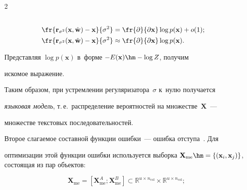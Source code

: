 \begin{multicols}{2}
\begin{align*}
\\


\fr{{\mathbf{r}}_{\sigma^2}(\mathbf{x}, \hat{\mathbf{w}}) - 


\mathbf{x}}{\sigma^2} &= \fr{\partial}{\partial \mathbf{x}}\log p(\mathbf{x}) + o(1);


\\


\fr{{\mathbf{r}}_{\sigma^2}(\mathbf{x}, \hat{\mathbf{w}}) - 


\mathbf{x}}{\sigma^2} &\approx \fr{\partial}{\partial \mathbf{x}}\log 


p(\mathbf{x}).


\end{align*}


Представляя $\log p(\mathbf{x})$ в~форме $-E(\mathbf{x}) \hm- \log Z$, получим 


искомое выражение.





\smallskip





Таким образом, при устремлении регуляризатора~$\sigma$ к~нулю получается  


\textit{языковая модель}, т.\,е.\ распределение вероятностей на множестве~$\mathbf{X}$~--- 


множестве текстовых последовательностей.





Второе слагаемое составной функции ошибки~--- ошибка отступа~\cite{wieting}. Для 


оптимизации этой функции ошибки используется выборка $\mathbf{X}_{\mathrm{me}}\hm = 


\{ (\mathbf{x}_i, \mathbf{x}_j)\}$, состоящая из пар объектов:


$$


    \mathbf{X}_{\mathrm{me}} = \left[\mathbf{X}_{\mathrm{me}}^A; \mathbf{X}_{\mathrm{me}}^B\right]  


\subset \mathbb{R}^{u \times n_{\mathrm{col}}}  \times  \mathbb{R}^{u \times 


n_{\mathrm{col}}};


$$





\vspace*{-14pt}






\end{multicols}
